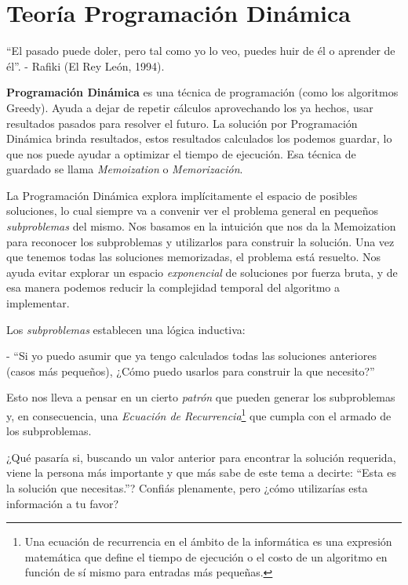 \section{Teoría Programación Dinámica}


``El pasado puede doler, pero tal como yo lo veo, puedes huir de él o aprender de él''. - Rafiki (El Rey León, 1994).

\textbf{Programación Dinámica} es una técnica de programación (como los algoritmos Greedy). Ayuda a dejar de repetir cálculos aprovechando los ya hechos, usar resultados pasados para resolver el futuro. 
La solución por Programación Dinámica brinda resultados, estos resultados calculados los podemos guardar, lo que nos puede ayudar a optimizar el tiempo de ejecución. Esa técnica de guardado se llama \textit{Memoization} o \textit{Memorización}.

La Programación Dinámica explora implícitamente el espacio de posibles soluciones, lo cual siempre va a convenir ver el problema general en pequeños \textit{subproblemas} del mismo.
Nos basamos en la intuición que nos da la Memoization para reconocer los subproblemas y utilizarlos para construir la solución. Una vez que tenemos todas las soluciones memorizadas, el problema está resuelto. Nos ayuda evitar explorar un espacio \textit{exponencial} de soluciones por fuerza bruta, y de esa manera podemos reducir la complejidad temporal del algoritmo a implementar.

Los \textit{subproblemas} establecen una lógica inductiva:

\noindent- ``Si yo puedo asumir que ya tengo calculados todas las soluciones anteriores (casos más pequeños), ¿Cómo puedo usarlos para construir la que necesito?''

Esto nos lleva a pensar en un cierto \textit{patrón} que pueden generar los subproblemas y, en consecuencia, una \textit{Ecuación de Recurrencia}\footnote{Una ecuación de recurrencia en el ámbito de la informática es una expresión matemática que define el tiempo de ejecución o el costo de un algoritmo en función de sí mismo para entradas más pequeñas.} que cumpla con el armado de los subproblemas.

¿Qué pasaría si, buscando un valor anterior para encontrar la solución requerida, viene la persona más importante y que más sabe de este tema a decirte: ``Esta es la solución que necesitas.''? Confiás plenamente, pero ¿cómo utilizarías esta información a tu favor?

